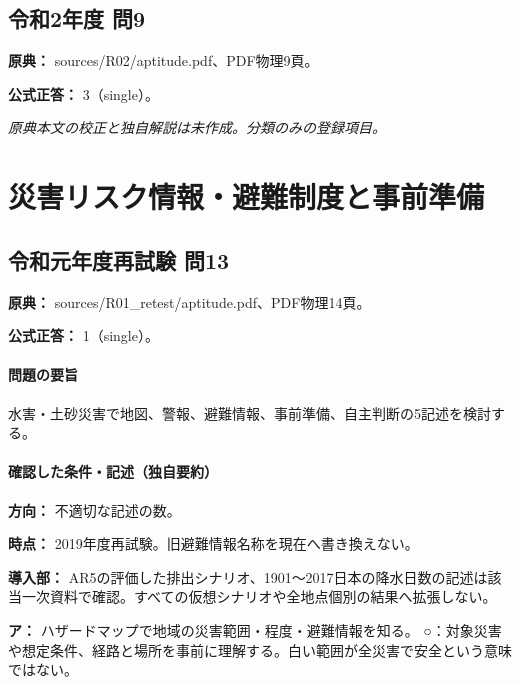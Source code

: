 \subsection{令和2年度 問9}
\label{q:r02-reg-apt-09}

\noindent\textbf{原典：} sources/R02/aptitude.pdf、PDF物理9頁。

\textbf{公式正答：} 3（single）。

\par\textit{原典本文の校正と独自解説は未作成。分類のみの登録項目。}

\section{災害リスク情報・避難制度と事前準備}

\subsection{令和元年度再試験 問13}
\label{q:r01-ret-apt-13}

\noindent\textbf{原典：} sources/R01\_retest/aptitude.pdf、PDF物理14頁。

\textbf{公式正答：} 1（single）。

\paragraph{問題の要旨} 水害・土砂災害で地図、警報、避難情報、事前準備、自主判断の5記述を検討する。

\paragraph{確認した条件・記述（独自要約）}\mbox{}\par

\noindent\textbf{方向：} 不適切な記述の数。\par

\noindent\textbf{時点：} 2019年度再試験。旧避難情報名称を現在へ書き換えない。\par

\noindent\textbf{導入部：} AR5の評価した排出シナリオ、1901〜2017日本の降水日数の記述は該当一次資料で確認。すべての仮想シナリオや全地点個別の結果へ拡張しない。\par

\noindent\textbf{ア：} ハザードマップで地域の災害範囲・程度・避難情報を知る。 ○：対象災害や想定条件、経路と場所を事前に理解する。白い範囲が全災害で安全という意味ではない。\par

